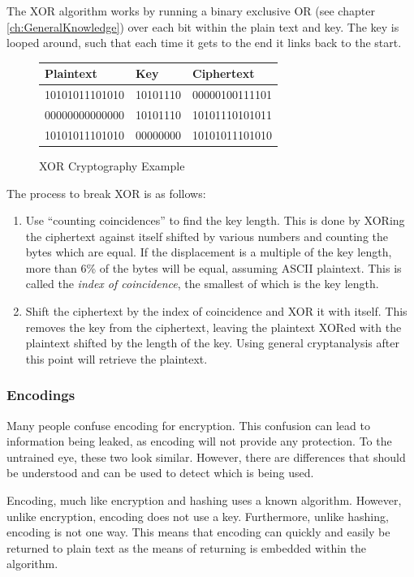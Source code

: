 				The XOR algorithm works by running a binary exclusive OR (see chapter \ref{ch:GeneralKnowledge})
				over each bit within the plain text and key.
				The key is looped around, such that each time it gets to the end it links back to the start.

				\begin{figure}[htb]
					\centering
					\begin{tabular}{lll}
						\toprule
						\textbf{Plaintext} & \textbf{Key} & \textbf{Ciphertext} \\
						\toprule
						10101011101010 & 10101110 & 00000100111101 \\
						00000000000000 & 10101110 & 10101110101011 \\
						10101011101010 & 00000000 & 10101011101010 \\
						\bottomrule
					\end{tabular}
					\caption{XOR Cryptography Example}
					\label{fig:XORExample}
				\end{figure}
				The process to break XOR is as follows:
				\begin{enumerate}
					\item Use ``counting coincidences'' to find the key length.
						This is done by XORing the ciphertext against itself shifted by various numbers and counting the bytes which are equal.
						If the displacement is a multiple of the key length, more than 6\% of the bytes will be equal, assuming ASCII plaintext.
						This is called the \emph{index of coincidence}, the smallest of which is the key length.
					\item Shift the ciphertext by the index of coincidence and XOR it with itself.
						This removes the key from the ciphertext, leaving the plaintext XORed with the plaintext shifted by the length of the key.
						Using general cryptanalysis after this point will retrieve the plaintext.
				\end{enumerate}

			\subsubsection{Encodings}
				Many people confuse encoding for encryption.
				This confusion can lead to information being leaked, as encoding will not provide any protection.
				To the untrained eye, these two look similar.
				However, there are differences that should be understood and can be used to detect which is being used.

				Encoding, much like encryption and hashing uses a known algorithm.
				However, unlike encryption, encoding does not use a key.
				Furthermore, unlike hashing, encoding is not one way.
				This means that encoding can quickly and easily be returned to plain text as the means of returning is embedded within the algorithm.

